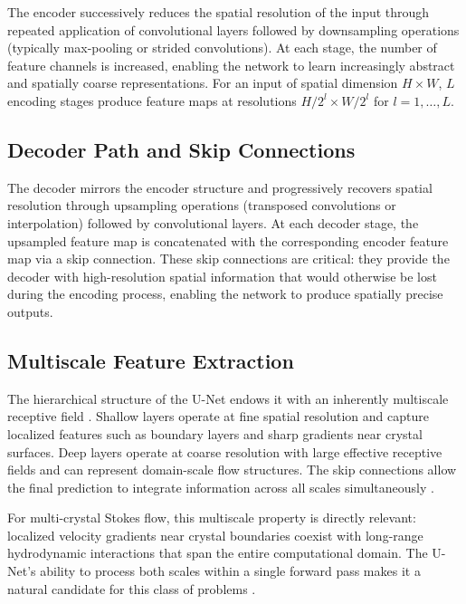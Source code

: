 The encoder successively reduces the spatial resolution of the input through
repeated application of convolutional layers followed by downsampling
operations (typically max-pooling or strided convolutions). At each stage, the
number of feature channels is increased, enabling the network to learn
increasingly abstract and spatially coarse representations. For an input of
spatial dimension $H \times W$, $L$ encoding stages produce feature maps at
resolutions $H/2^l \times W/2^l$ for $l = 1, \ldots, L$.

\subsection{Decoder Path and Skip Connections}

The decoder mirrors the encoder structure and progressively recovers spatial
resolution through upsampling operations (transposed convolutions or
interpolation) followed by convolutional layers. At each decoder stage, the
upsampled feature map is concatenated with the corresponding encoder feature
map via a skip connection. These skip connections are critical: they provide
the decoder with high-resolution spatial information that would otherwise be
lost during the encoding process, enabling the network to produce spatially
precise outputs.

\subsection{Multiscale Feature Extraction}

The hierarchical structure of the U-Net endows it with an inherently
multiscale receptive field \parencite{ronneberger_u-net_2015}. Shallow layers operate at fine spatial resolution
and capture localized features such as boundary layers and sharp gradients
near crystal surfaces. Deep layers operate at coarse resolution with large
effective receptive fields and can represent domain-scale flow structures.
The skip connections allow the final prediction to integrate information
across all scales simultaneously \parencite{ronneberger_u-net_2015}.

For multi-crystal Stokes flow, this multiscale property is directly relevant:
localized velocity gradients near crystal boundaries coexist with long-range
hydrodynamic interactions that span the entire computational domain. The
U-Net's ability to process both scales within a single forward pass makes it a
natural candidate for this class of problems \parencite{thuerey_deep_2020}.

